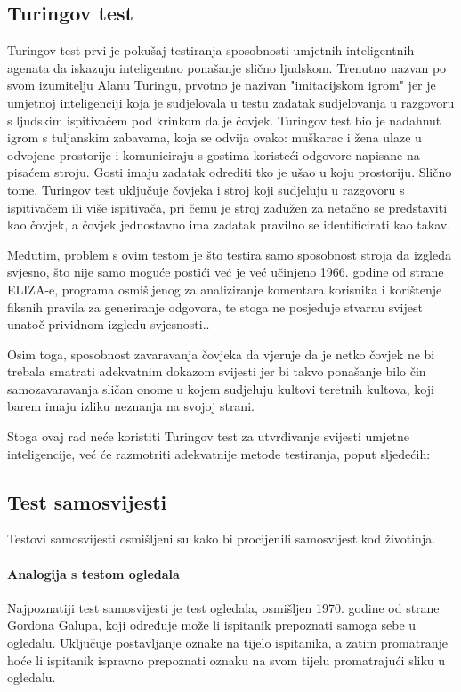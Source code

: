 \documentclass[diplomskirad]{fer}
\begin{document}
\subsection{Turingov test}
Turingov test prvi je pokušaj testiranja sposobnosti umjetnih inteligentnih agenata da iskazuju inteligentno ponašanje slično ljudskom.
Trenutno nazvan po svom izumitelju Alanu Turingu, prvotno je nazivan "imitacijskom igrom" jer je umjetnoj inteligenciji koja je sudjelovala u testu zadatak sudjelovanja u razgovoru s ljudskim ispitivačem pod krinkom da je čovjek.
Turingov test bio je nadahnut igrom s tuljanskim zabavama, koja se odvija ovako: muškarac i žena ulaze u odvojene prostorije i komuniciraju s gostima koristeći odgovore napisane na pisaćem stroju. Gosti imaju zadatak odrediti tko je ušao u koju prostoriju.
Slično tome, Turingov test uključuje čovjeka i stroj koji sudjeluju u razgovoru s ispitivačem ili više ispitivača, pri čemu je stroj zadužen za netačno se predstaviti kao čovjek, a čovjek jednostavno ima zadatak pravilno se identificirati kao takav.

Međutim, problem s ovim testom je što testira samo sposobnost stroja da izgleda svjesno, što nije samo moguće postići već je već učinjeno 1966. godine od strane ELIZA-e, programa osmišljenog za analiziranje komentara korisnika i korištenje fiksnih pravila za generiranje odgovora, te stoga ne posjeduje stvarnu svijest unatoč prividnom izgledu svjesnosti.\cite{ELIZA}.

Osim toga, sposobnost zavaravanja čovjeka da vjeruje da je netko čovjek ne bi trebala smatrati adekvatnim dokazom svijesti jer bi takvo ponašanje bilo čin samozavaravanja sličan onome u kojem sudjeluju kultovi teretnih kultova, koji barem imaju izliku neznanja na svojoj strani.

Stoga ovaj rad neće koristiti Turingov test za utvrđivanje svijesti umjetne inteligencije, već će razmotriti adekvatnije metode testiranja, poput sljedećih:

\subsection{Test samosvijesti}
Testovi samosvijesti osmišljeni su kako bi procijenili samosvijest kod životinja.
\paragraph{Analogija s testom ogledala}
Najpoznatiji test samosvijesti je test ogledala, osmišljen 1970. godine od strane Gordona Galupa, koji određuje može li ispitanik prepoznati samoga sebe u ogledalu.
Uključuje postavljanje oznake na tijelo ispitanika, a zatim promatranje hoće li ispitanik ispravno prepoznati oznaku na svom tijelu promatrajući sliku u ogledalu.
\end{document}
